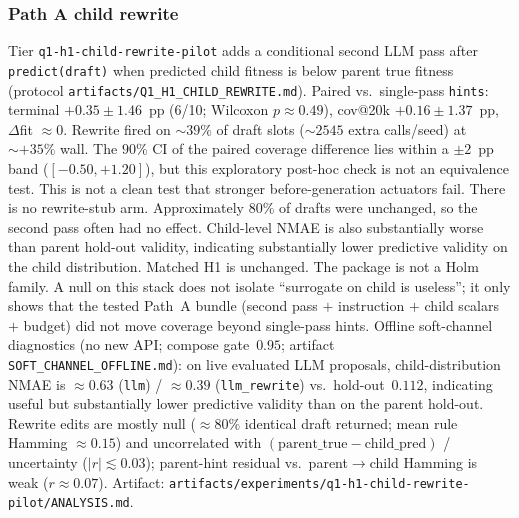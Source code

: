 \subsubsection*{Path A child rewrite}
Tier \texttt{q1-h1-child-rewrite-pilot} adds a conditional second LLM pass after \texttt{predict(draft)} when predicted child fitness is below parent true fitness (protocol \texttt{artifacts/Q1\_H1\_CHILD\_REWRITE.md}). Paired vs.\ single-pass \texttt{hints}: terminal $+0.35\pm1.46$~pp (6/10; Wilcoxon $p{\approx}0.49$), cov@20k $+0.16\pm1.37$~pp, $\Delta$fit ${\approx}0$. Rewrite fired on ${\sim}39\%$ of draft slots (${\sim}2545$ extra calls/seed) at ${\sim}{+}35\%$ wall. The $90\%$ CI of the paired coverage difference lies within a $\pm 2$~pp band ($[-0.50,+1.20]$), but this exploratory post-hoc check is not an equivalence test. This is not a clean test that stronger before-generation actuators fail. There is no rewrite-stub arm. Approximately $80\%$ of drafts were unchanged, so the second pass often had no effect. Child-level NMAE is also substantially worse than parent hold-out validity, indicating substantially lower predictive validity on the child distribution. Matched H1 is unchanged. The package is not a Holm family. A null on this stack does not isolate ``surrogate on child is useless''; it only shows that the tested Path~A bundle (second pass $+$ instruction $+$ child scalars $+$ budget) did not move coverage beyond single-pass hints. Offline soft-channel diagnostics (no new API; compose gate~$0.95$; artifact \texttt{SOFT\_CHANNEL\_OFFLINE.md}): on live evaluated LLM proposals, child-distribution NMAE is ${\approx}0.63$ (\texttt{llm}) / ${\approx}0.39$ (\texttt{llm\_rewrite}) vs.\ hold-out~$0.112$, indicating useful but substantially lower predictive validity than on the parent hold-out. Rewrite edits are mostly null (${\approx}80\%$ identical draft returned; mean rule Hamming ${\approx}0.15$) and uncorrelated with $(\mathrm{parent\_true}-\mathrm{child\_pred})$ / uncertainty ($|r|{\lesssim}0.03$); parent-hint residual vs.\ parent$\to$child Hamming is weak ($r{\approx}0.07$). Artifact: \texttt{artifacts/experiments/q1-h1-child-rewrite-pilot/ANALYSIS.md}.

